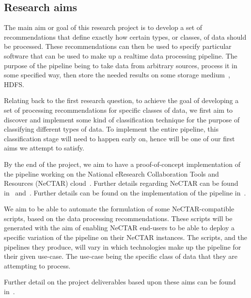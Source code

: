 \documentclass[a4paper,11pt]{article}
\begin{document}


\subsection{Research aims} %
\label{sub:research_aims}

The main aim or goal of this research project is to develop a set of recommendations that define exactly how certain
types, or classes, of data should be processed. These recommendations can then be used to specify particular software
that can be used to make up a realtime data processing pipeline. The purpose of the pipeline being to take data from
arbitrary sources, process it in some specified way, then store the needed results on some storage medium~\eg{}, HDFS.

Relating back to the first research question, to achieve the goal of developing a set of processing recommendations for
specific classes of data, we first aim to discover and implement some kind of classification technique for the purpose of
classifying different types of data. To implement the entire pipeline, this classification stage will need to happen early
on, hence will be one of our first aims we attempt to satisfy.

By the end of the project, we aim to have a proof-of-concept implementation of the pipeline working on the National
eResearch Collaboration Tools and Resources (NeCTAR) cloud~\cite{web:Nectar}. Further details regarding NeCTAR can be
found in~ and~. Further details can be found on the
implementation of the pipeline in~.

We aim to be able to automate the formulation of some NeCTAR-compatible scripts, based on the data processing
recommendations. These scripts will be generated with the aim of enabling NeCTAR end-users to be able to deploy a
specific variation of the pipeline on their NeCTAR instances. The scripts, and the pipelines they produce, will vary in
which technologies make up the pipeline for their given use-case. The use-case being the specific class of data that
they are attempting to process.

Further detail on the project deliverables based upon these aims can be found in~.


\end{document}
